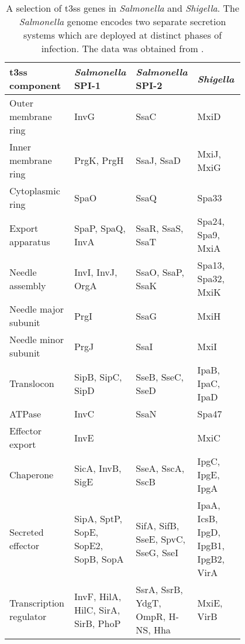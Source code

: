 \begin{table}
  \centering
  \caption[Homologous genes of \gls{t3ss} in \textit{Salmonella} and \textit{Shigella}.]{A selection of \gls{t3ss} genes in \textit{Salmonella} and \textit{Shigella}. The \textit{Salmonella} genome encodes two separate secretion systems which are deployed at distinct phases of infection. The data was obtained from \cite{Wang2012}.}
  \label{tab:t3ss-genes}
  \footnotesize
  \begin{tabular}{L{0.2\linewidth}L{0.2\linewidth}L{0.2\linewidth}L{0.2\linewidth}}
    \gls{t3ss} component&
      \textit{Salmonella} SPI-1 &
      \textit{Salmonella} SPI-2 &
      \textit{Shigella} \\
    \hline 
    Outer membrane ring &
      InvG &
      SsaC &
      MxiD \\
    Inner membrane ring &
      PrgK, PrgH &
      SsaJ, SsaD &
      MxiJ, MxiG \\
    Cytoplasmic ring &
      SpaO &
      SsaQ &
      Spa33 \\
    Export apparatus &
      SpaP, SpaQ, InvA &
      SsaR, SsaS, SsaT &
      Spa24, Spa9, MxiA \\
    Needle assembly &
      InvI, InvJ, OrgA &
      SsaO, SsaP, SsaK &
      Spa13, Spa32, MxiK \\
    Needle major subunit &
      PrgI &
      SsaG &
      MxiH \\
    Needle minor subunit &
      PrgJ &
      SsaI &
      MxiI \\
    Translocon &
      SipB, SipC, SipD &
      SseB, SseC, SseD &
      IpaB, IpaC, IpaD \\
    ATPase &
      InvC &
      SsaN &
      Spa47 \\
    Effector export &
      InvE &
      &
      MxiC \\
    Chaperone &
      SicA, InvB, SigE &
      SseA, SscA, SscB &
      IpgC, IpgE, IpgA \\
    Secreted effector &
      SipA, SptP, SopE, SopE2, SopB, SopA &
      SifA, SifB, SseE, SpvC, SseG, SseI &
      IpaA, IcsB, IpgD, IpgB1, IpgB2, VirA \\
    Transcription regulator &
      InvF, HilA, HilC, SirA, SirB, PhoP &
      SsrA, SsrB, YdgT, OmpR, H-NS, Hha &
      MxiE, VirB \\
      \hline
  \end{tabular}
\end{table}

